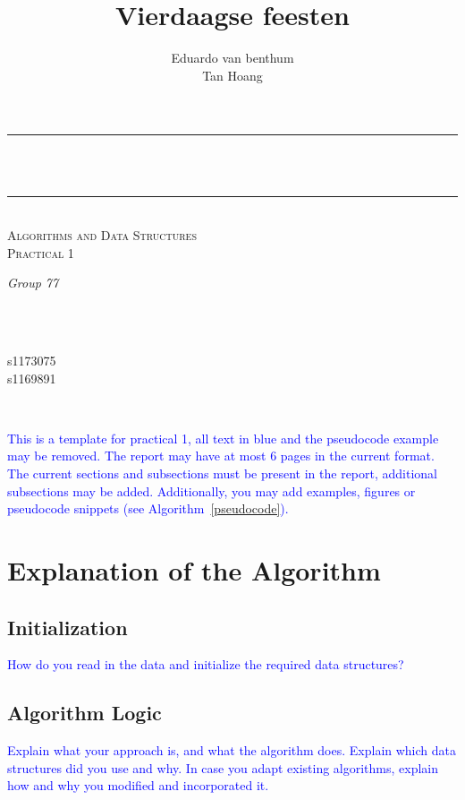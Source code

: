 \documentclass[a4paper]{article}
\title{Vierdaagse feesten}
\author{Eduardo van benthum \\ Tan Hoang}
\makeatletter
\newcommand{\instruction}[1]{\textcolor{blue}{#1}}
\let\thetitle\@title
\let\theauthor\@author
\makeatother
\begin{document}
\begin{center}
\rule{\linewidth}{0.2 mm} \\[0.4 cm]
{ \huge \bfseries \thetitle}\\
\rule{\linewidth}{0.2 mm} \\[0.5 cm]
\textsc{\Large Algorithms and Data Structures}\\[0.2 cm]				
\textsc{\large Practical 1}\\[0.5 cm]				

\begin{minipage}{0.4\textwidth}
    \begin{flushleft} \large
        \emph{Group 77}\\
        \theauthor
        \end{flushleft}
        \end{minipage}~
        \begin{minipage}{0.4\textwidth}
        \begin{flushright} \large
        ~\\
        s1173075\\	s1169891
    \end{flushright}
\end{minipage}\\[1 cm]
\end{center}

\noindent\instruction{This is a template for practical 1, all text in blue and the pseudocode example may be removed. The report may have at most 6 pages in the current format. The current sections and subsections must be present in the report, additional subsections may be added. Additionally, you may add examples, figures or pseudocode snippets (see Algorithm~\ref{pseudocode}).}


\section{Explanation of the Algorithm}
\subsection{Initialization}
\instruction{How do you read in the data and initialize the required data structures?}

\subsection{Algorithm Logic}
\instruction{Explain what your approach is, and what the algorithm does. Explain which data structures did you use and why. In case you adapt existing algorithms, explain how and why you modified and incorporated it.}
\end{document}

